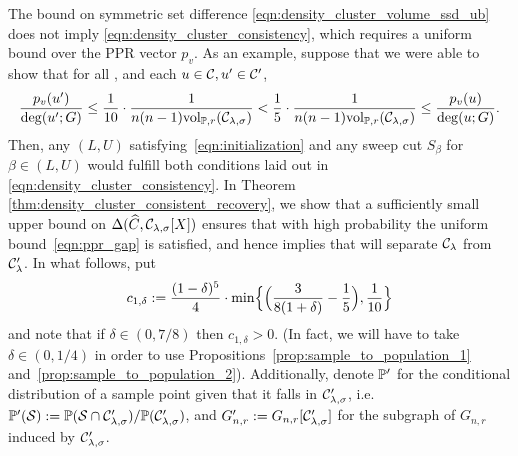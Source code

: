 The bound on symmetric set difference \eqref{eqn:density_cluster_volume_ssd_ub} does not imply \eqref{eqn:density_cluster_consistency}, which requires a
uniform bound over the PPR vector $p_v$. As an example, suppose that we were
able to show that for all , and each $u \in \mathcal{C}, u' \in \mathcal{C}'$,  
\begin{equation}
\label{eqn:ppr_gap}
\frac{p_v(u')}{\deg(u';G)} \leq \frac{1}{10} \cdot \frac{1}{n (n - 1) \mathrm{vol}_{\mathbb{P},r}(\mathcal{C}_{\lambda,\sigma})} <
\frac{1}{5} \cdot \frac{1}{n (n-1) \mathrm{vol}_{\mathbb{P},r}(\mathcal{C}_{\lambda,\sigma})} \leq \frac{p_v(u)}{\deg(u;G)}. 
\end{equation}
Then, any $(L,U)$ satisfying~\eqref{eqn:initialization} and any sweep cut
$S_{\beta}$ for $\beta \in (L,U)$ would fulfill both conditions laid out in
\eqref{eqn:density_cluster_consistency}. In Theorem 
\ref{thm:density_cluster_consistent_recovery}, we show that a sufficiently 
small upper bound on $\Delta(\widehat{C},\mathcal{C}_{\lambda,\sigma}[X])$ ensures that with high probability the uniform bound~\eqref{eqn:ppr_gap} is satisfied, and hence implies
that  will separate $\mathcal{C}_{\lambda}$ from $\mathcal{C}_{\lambda}'$. In what follows, put
\begin{equation*}
c_{1,\delta} := \frac{(1 - \delta)^5}{4} \cdot \min\Bigl\{\Bigl(\frac{3}{8(1 + \delta)} - \frac{1}{5}\Bigr),\frac{1}{10}\Bigr\}
\end{equation*}
and note that if $\delta \in (0,7/8)$ then $c_{1,\delta} > 0$. (In fact, we will have to take $\delta \in (0,1/4)$ in order to use Propositions~\ref{prop:sample_to_population_1} and~\ref{prop:sample_to_population_2}). Additionally, denote $\mathbb{P}'$ for the conditional distribution of a sample point given that it falls in $\mathcal{C}_{\lambda,\sigma}'$, i.e. $\mathbb{P}'(\mathcal{S}) := \mathbb{P}(\mathcal{S} \cap \mathcal{C}_{\lambda,\sigma}')/\mathbb{P}(\mathcal{C}_{\lambda,\sigma}')$, and $G_{n,r}' := G_{n,r}[\mathcal{C}_{\lambda,\sigma}']$ for the subgraph of $G_{n,r}$ induced by $\mathcal{C}_{\lambda,\sigma}'$. 
